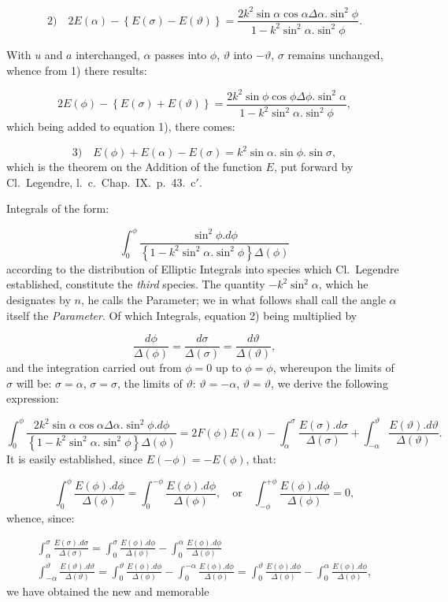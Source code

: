 \documentclass{article}
\begin{document}
\[
\text{2)}\quad2E(\alpha)-\left\{E(\sigma)-E(\vartheta)\right\}=\frac{2k^{2}\sin\alpha\cos\alpha\Delta\alpha.\sin^{2}\phi}{1-k^{2}\sin^{2}\alpha.\sin^{2}\phi}.
\]

With $u$ and $a$ interchanged, $\alpha$ passes into $\phi$, $\vartheta$ into $-\vartheta$, $\sigma$ remains unchanged, whence from 1) there results:

\[
2E(\phi)-\left\{E(\sigma)+E(\vartheta)\right\}=\frac{2k^{2}\sin\phi\cos\phi\Delta\phi.\sin^{2}\alpha}{1-k^{2}\sin^{2}\alpha.\sin^{2}\phi},
\]
which being added to equation 1), there comes:

\[
\text{3)}\quad E(\phi)+E(\alpha)-E(\sigma)=k^{2}\sin\alpha.\sin\phi.\sin\sigma,
\]
which is the theorem on the Addition of the function $E$, put forward by Cl.\ Legendre, l.\ c.\ Chap.\ IX.\ p.\ 43.\ c$'$.

Integrals of the form:

\[
\int_{0}^{\phi}\frac{\sin^{2}\phi.d\phi}{\left\{1-k^{2}\sin^{2}\alpha.\sin^{2}\phi\right\}\Delta(\phi)}
\]
according to the distribution of Elliptic Integrals into species which Cl.\ Legendre established, constitute the \emph{third} species. The quantity $-k^{2}\sin^{2}\alpha$, which he designates by $n$, he calls the Parameter; we in what follows shall call the angle $\alpha$ itself the \emph{Parameter}. Of which Integrals, equation 2) being multiplied by

\[
\frac{d\phi}{\Delta(\phi)}=\frac{d\sigma}{\Delta(\sigma)}=\frac{d\vartheta}{\Delta(\vartheta)},
\]
and the integration carried out from $\phi=0$ up to $\phi=\phi$, whereupon the limits of $\sigma$ will be: $\sigma=\alpha$, $\sigma=\sigma$, the limits of $\vartheta$: $\vartheta=-\alpha$, $\vartheta=\vartheta$, we derive the following expression:

\[
\int_{0}^{\phi}\frac{2k^{2}\sin\alpha\cos\alpha\Delta\alpha.\sin^{2}\phi.d\phi}{\left\{1-k^{2}\sin^{2}\alpha.\sin^{2}\phi\right\}\Delta(\phi)}=2F(\phi)E(\alpha)-\int_{\alpha}^{\sigma}\frac{E(\sigma).d\sigma}{\Delta(\sigma)}+\int_{-\alpha}^{\vartheta}\frac{E(\vartheta).d\vartheta}{\Delta(\vartheta)}.
\]
It is easily established, since $E(-\phi)=-E(\phi)$, that:

\[
\int_{0}^{\phi}\frac{E(\phi).d\phi}{\Delta(\phi)}=\int_{0}^{-\phi}\frac{E(\phi).d\phi}{\Delta(\phi)},\quad\text{or}\quad\int_{-\phi}^{+\phi}\frac{E(\phi).d\phi}{\Delta(\phi)}=0,
\]
whence, since:

\[
\begin{gathered}
\int_{\alpha}^{\sigma}\frac{E(\sigma).d\sigma}{\Delta(\sigma)}=\int_{0}^{\sigma}\frac{E(\phi).d\phi}{\Delta(\phi)}-\int_{0}^{\alpha}\frac{E(\phi).d\phi}{\Delta(\phi)}\\[1.5ex]
\int_{-\alpha}^{\vartheta}\frac{E(\vartheta).d\vartheta}{\Delta(\vartheta)}=\int_{0}^{\vartheta}\frac{E(\phi).d\phi}{\Delta(\phi)}-\int_{0}^{-\alpha}\frac{E(\phi).d\phi}{\Delta(\phi)}=\int_{0}^{\vartheta}\frac{E(\phi).d\phi}{\Delta(\phi)}-\int_{0}^{\alpha}\frac{E(\phi).d\phi}{\Delta(\phi)},
\end{gathered}
\]
we have obtained the new and memorable
\end{document}
